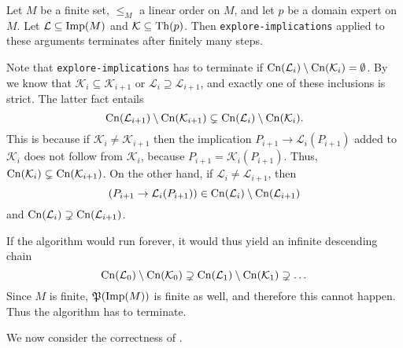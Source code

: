 \begin{Theorem}
  \label{thm:explore-implications-termination}
  Let $M$ be a finite set, $\leq_M$ a linear order on $M$, and let $p$ be a domain expert on
  $M$. Let $\mathcal{L} \subseteq \operatorname{Imp}(M)$ and $\mathcal{K} \subseteq \operatorname{Th}(p)$.  Then
  \lstinline{explore-implications} applied to these arguments terminates after finitely
  many steps.
\end{Theorem}
\begin{Proof}
  Note that \lstinline{explore-implications} has to terminate if $\operatorname{Cn}(\mathcal{L}_i)
  \setminus \operatorname{Cn}(\mathcal{K}_i) = \emptyset$.  By
   we know that $\mathcal{K}_i
  \subseteq \mathcal{K}_{i+1}$ or $\mathcal{L}_i \supseteq \mathcal{L}_{i+1}$, and exactly
  one of these inclusions is strict.  The latter fact entails
  \begin{equation}
    \label{eq:36}
    \operatorname{Cn}(\mathcal{L}_{i+1}) \setminus \operatorname{Cn}(\mathcal{K}_{i+1}) \subsetneq \operatorname{Cn}(\mathcal{L}_i)
    \setminus \operatorname{Cn}(\mathcal{K}_i).
  \end{equation}
  This is because if $\mathcal{K}_i \neq \mathcal{K}_{i+1}$ then the implication $P_{i+1}
  \to \mathcal{L}_i(P_{i+1})$ added to $\mathcal{K}_{i}$ does not follow from
  $\mathcal{K}_i$, because $P_{i+1} = \mathcal{K}_{i}(P_{i+1})$.  Thus,
  $\operatorname{Cn}(\mathcal{K}_i) \subsetneq \operatorname{Cn}(\mathcal{K}_{i+1})$.  On the other hand, if
  $\mathcal{L}_i \neq \mathcal{L}_{i+1}$, then
  \begin{equation*}
    (P_{i+1} \to \mathcal{L}_i(P_{i+1})) \in \operatorname{Cn}(\mathcal{L}_i) \setminus \operatorname{Cn}(\mathcal{L}_{i+1})
  \end{equation*}
  and $\operatorname{Cn}(\mathcal{L}_i) \supsetneq \operatorname{Cn}(\mathcal{L}_{i+1})$.

  If the algorithm would run forever, it would thus yield an infinite descending chain
  \begin{equation*}
    \operatorname{Cn}(\mathcal{L}_0) \setminus \operatorname{Cn}(\mathcal{K}_0) \supsetneq \operatorname{Cn}(\mathcal{L}_1)
    \setminus \operatorname{Cn}(\mathcal{K}_1) \supsetneq \dots
  \end{equation*}
  Since $M$ is finite, ${\mathfrak{P}(\operatorname{Imp}(M))}$ is finite as well, and therefore this cannot
  happen.  Thus the algorithm has to terminate.
\end{Proof}

We now consider the correctness of .

